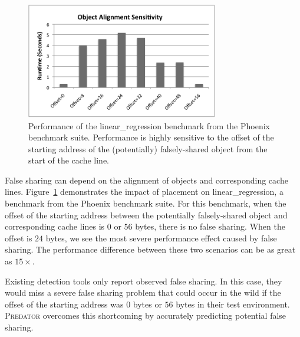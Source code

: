 \documentclass[10pt]{sigplanconf}
\newcommand{\Predator}{{\scshape Predator}}
\begin{document}
\begin{figure}[!t]
\begin{center}
\vspace{1.2em}
\includegraphics[width=3.3in]{fig/perfsensitive}
\vspace{1.2em}
\end{center}
\caption{
Performance of the linear\_regression benchmark from the Phoenix benchmark suite.
Performance is highly sensitive to the offset of the starting address of the (potentially) falsely-shared object 
from the start of the cache line. 
\label{fig:perfsensitive}}
\end{figure}

False sharing can depend on 
the alignment of objects and corresponding cache lines.
Figure~\ref{fig:perfsensitive} demonstrates the impact of placement on linear\_regression, a benchmark from the Phoenix benchmark suite.
For this benchmark,
when the offset of the starting address between the potentially falsely-shared object and corresponding cache lines 
is $0$ or $56$ bytes, 
there is no false sharing. 
When the offset is $24$ bytes, we see the most severe performance effect caused 
by false sharing. 
The performance difference between these two scenarios can be as great as $15\times$.

Existing detection tools only report observed false sharing.
In this case, they would miss a severe false sharing problem that could occur in the wild if the offset of the starting 
address was $0$ bytes or $56$ bytes in their test environment.
\Predator{} overcomes this shortcoming by accurately predicting potential false sharing.
\end{document}
